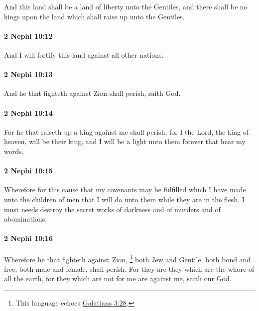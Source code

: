 			And this land shall be a land of liberty unto the Gentiles,
			and there shall be no kings upon the land
			which shall raise up unto the Gentiles.

		\paragraph{2 Nephi 10:12} %
			\label{2NEPHI-10-12}

			And I will fortify this land against all other nations.

		\paragraph{2 Nephi 10:13} %
			\label{2NEPHI-10-13}

			And he that fighteth against Zion shall perish, saith God.

		\paragraph{2 Nephi 10:14} %
			\label{2NEPHI-10-14}

			For he that raiseth up a king against me shall perish,
			for I the Lord, the king of heaven, will be their king,
			and I will be a light unto them forever that hear my words.

		\paragraph{2 Nephi 10:15} %
			\label{2NEPHI-10-15}

			Wherefore for this cause that my covenants may be fulfilled
			which I have made unto the children of men
			that I will do unto them while they are in the flesh,
			I must needs destroy the secret works of darkness
			and of murders and of abominations.

		\paragraph{2 Nephi 10:16} %
			\label{2NEPHI-10-16}

			Wherefore he that fighteth against Zion,%
				\footnote{%
					This language echoes \hyperref[GALATIANS-3-28]{Galatians 3:28}.
					}
			both Jew and Gentile, both bond and free, both male and female, shall perish.
			For they are they which are the whore of all the earth,
			for they which are not for me are against me, saith our God.

